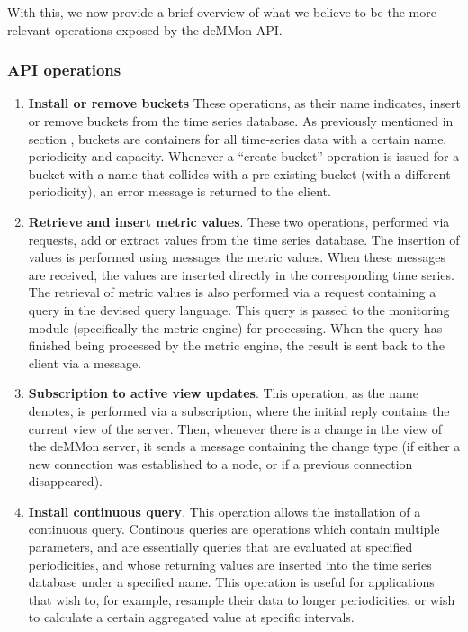 With this, we now provide a brief overview of what we believe to be the more relevant operations exposed by the deMMon API.

\subsubsection{API operations}

\begin{enumerate}
    \item \textbf{Install or remove buckets} These operations, as their name indicates, insert or remove buckets from the time series database. As previously mentioned in section , buckets are containers for all time-series data with a certain name, periodicity and capacity. Whenever a ``create bucket'' operation is issued for a bucket with a name that collides with a pre-existing bucket (with a different periodicity), an error message is returned to the client.
    
    \item \textbf{Retrieve and insert metric values}. These two operations, performed via requests, add or extract values from the time series database. The insertion of values is performed using messages the metric values. When these messages are received, the values are inserted directly in the corresponding time series. The retrieval of metric values is also performed via a request containing a query in the devised query language. This query is passed to the monitoring module (specifically the metric engine) for processing. When the query has finished being processed by the metric engine, the result is sent back to the client via a message.
    
    \item \textbf{Subscription to active view updates}. This operation, as the name denotes, is performed via a subscription, where the initial reply contains the current view of the server. Then, whenever there is a change in the view of the deMMon server, it sends a message containing the change type (if either a new connection was established to a node, or if a previous connection disappeared).
    
    \item \textbf{Install continuous query}. This operation allows the installation of a continuous query. Continous queries are operations which contain multiple parameters, and are essentially queries that are evaluated at specified periodicities, and whose returning values are inserted into the time series database under a specified name. This operation is useful for applications that wish to, for example, resample their data to longer periodicities, or wish to calculate a certain aggregated value at specific intervals. 


\end{enumerate}
